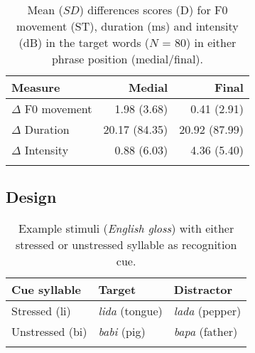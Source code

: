 \begin{table}
\caption{Mean ($SD$) differences scores (D) for F0 movement (ST), duration (ms) and intensity (dB) in the target words ($N$ = 80) in either phrase position (medial/final).}
\label{tab36}
\begin{tabularx}{0.8\textwidth}{Xrr}
 \lsptoprule
 Measure & Medial & Final\\
 \midrule
 $\Delta$ F0 movement & 1.98 (3.68) & 0.41 (2.91)\\
 $\Delta$ Duration & 20.17 (84.35) & 20.92 (87.99)\\
 $\Delta$ Intensity & 0.88 (6.03) & 4.36 (5.40)\\
 \lspbottomrule
\end{tabularx}
\end{table}

\subsection{Design}


\begin{table}[b]
\caption{Example stimuli (\textit{English gloss}) with either stressed or unstressed syllable as recognition cue.}
\label{tab37}
\begin{tabularx}{0.8\textwidth}{XXX}
\lsptoprule
 Cue syllable & Target & Distractor\\
\midrule
 Stressed (li) & \textit{lida} (tongue) & \textit{lada} (pepper)\\
 Unstressed (bi) & \textit{babi} (pig) & \textit{bapa} (father)\\
\lspbottomrule
\end{tabularx}
\end{table}

